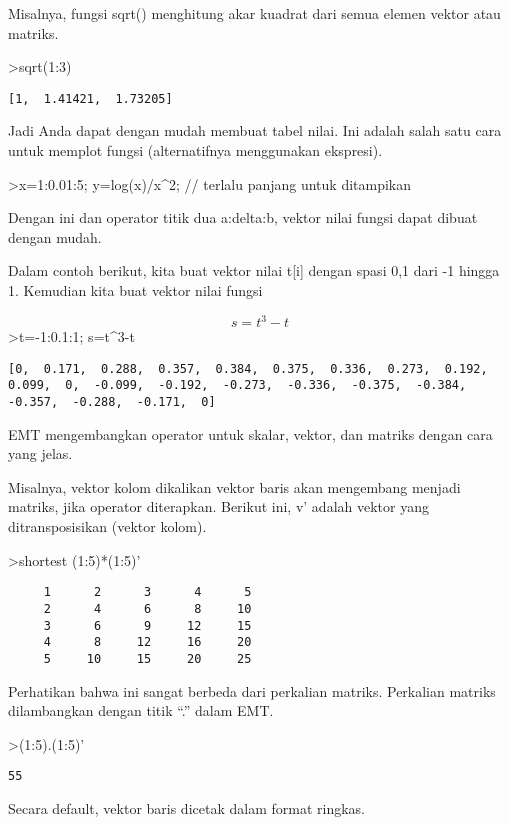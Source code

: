 \documentclass[
]{book}
\begin{document}
Misalnya, fungsi sqrt() menghitung akar kuadrat dari semua elemen vektor atau matriks.

\textgreater sqrt(1:3)

\begin{verbatim}
[1,  1.41421,  1.73205]
\end{verbatim}

Jadi Anda dapat dengan mudah membuat tabel nilai. Ini adalah salah satu cara untuk memplot fungsi (alternatifnya menggunakan ekspresi).

\textgreater x=1:0.01:5; y=log(x)/x\^{}2; // terlalu panjang untuk ditampikan

Dengan ini dan operator titik dua a:delta:b, vektor nilai fungsi dapat dibuat dengan mudah.

Dalam contoh berikut, kita buat vektor nilai t{[}i{]} dengan spasi 0,1 dari -1 hingga 1. Kemudian kita buat vektor nilai fungsi

\[s = t^3-t\]\textgreater t=-1:0.1:1; s=t\^{}3-t

\begin{verbatim}
[0,  0.171,  0.288,  0.357,  0.384,  0.375,  0.336,  0.273,  0.192,
0.099,  0,  -0.099,  -0.192,  -0.273,  -0.336,  -0.375,  -0.384,
-0.357,  -0.288,  -0.171,  0]
\end{verbatim}

EMT mengembangkan operator untuk skalar, vektor, dan matriks dengan cara yang jelas.

Misalnya, vektor kolom dikalikan vektor baris akan mengembang menjadi matriks, jika operator diterapkan. Berikut ini, v' adalah vektor yang ditransposisikan (vektor kolom).

\textgreater shortest (1:5)*(1:5)'

\begin{verbatim}
     1      2      3      4      5 
     2      4      6      8     10 
     3      6      9     12     15 
     4      8     12     16     20 
     5     10     15     20     25 
\end{verbatim}

Perhatikan bahwa ini sangat berbeda dari perkalian matriks. Perkalian matriks dilambangkan dengan titik ``.'' dalam EMT.

\textgreater(1:5).(1:5)'

\begin{verbatim}
55
\end{verbatim}

Secara default, vektor baris dicetak dalam format ringkas.
\end{document}
